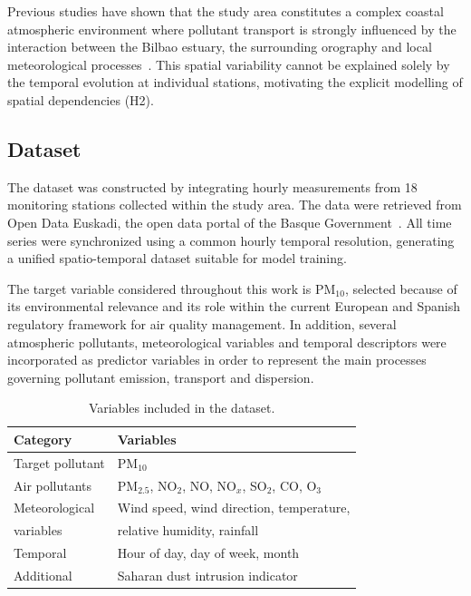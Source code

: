 \documentclass[11pt]{article}
\begin{document}
Previous studies have shown that the study area constitutes a complex coastal atmospheric environment where pollutant transport is strongly influenced by the interaction between the Bilbao estuary, the surrounding orography and local meteorological processes~\cite{Oke1987,Whiteman2000,GonzalezAparicio2013}. This spatial variability cannot be explained solely by the temporal evolution at individual stations, motivating the explicit modelling of spatial dependencies (H2).

\subsection{Dataset}

The dataset was constructed by integrating hourly measurements from 18 monitoring stations collected within the study area. The data were retrieved from Open Data Euskadi, the open data portal of the Basque Government~\cite{OpenDataEuskadi}. All time series were synchronized using a common hourly temporal resolution, generating a unified spatio-temporal dataset suitable for model training.

The target variable considered throughout this work is PM$_{10}$, selected because of its environmental relevance and its role within the current European and Spanish regulatory framework for air quality management. In addition, several atmospheric pollutants, meteorological variables and temporal descriptors were incorporated as predictor variables in order to represent the main processes governing pollutant emission, transport and dispersion.

\begin{table}[H]
\centering
\caption{Variables included in the dataset.}
\label{tab:variables}
\renewcommand{\arraystretch}{1.15}
\begin{tabular}{ll}
\toprule
\textbf{Category} & \textbf{Variables} \\
\midrule
Target pollutant &
PM$_{10}$ \\
\addlinespace
Air pollutants &
PM$_{2.5}$, NO$_2$, NO, NO$_x$, SO$_2$, CO, O$_3$ \\
\addlinespace
Meteorological &
Wind speed, wind direction, temperature,\\
variables &
relative humidity, rainfall \\
\addlinespace
Temporal &
Hour of day, day of week, month \\
\addlinespace
Additional &
Saharan dust intrusion indicator \\
\bottomrule
\end{tabular}
\end{table}
\end{document}
